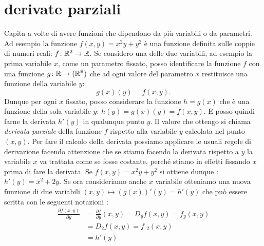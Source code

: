 \section{derivate parziali}

Capita a volte di avere funzioni che dipendono da più variabili o da parametri.
Ad esempio la funzione $f(x,y) = x^2y+y^2$ è una funzione definita 
sulle coppie di numeri reali: $f\colon {\mathbb R}^2\to {\mathbb R}$.
Se considero una delle due variabili, ad esempio la prima variabile $x$, 
come un parametro fissato, posso identificare la funzione $f$ con 
una funzione $g\colon {\mathbb R} \to ({\mathbb R}^{\mathbb R})$ 
che ad ogni valore del parametro $x$ restituisce una funzione 
della variabile $y$:
\[
  g(x)(y) = f(x,y).
\]
Dunque per ogni $x$ fissato, posso considerare la funzione $h=g(x)$
che è una funzione della sola variabile $y$: $h(y) = g(x)(y) = f(x,y)$.  
E posso quindi farne la derivata $h'(y)$ in qualunque punto $y$. 
Il valore che ottengo si chiama \emph{derivata parziale}%
%
della funzione $f$ rispetto alla variabile $y$ calcolata nel punto $(x,y)$.
Per fare il calcolo della derivata possiamo applicare le usuali regole di 
derivazione facendo attenzione che se stiamo 
facendo la derivata rispetto a $y$ la variabile $x$ va trattata come se 
fosse costante, perché stiamo in effetti fissando $x$ prima di fare la derivata.
Se $f(x,y) = x^2y+y^2$ si ottiene dunque%
:
$h'(y) = x^2 + 2y$.
Se ora consideriamo anche $x$ variabile otteniamo una nuova funzione di due 
variabili $(x,y)\mapsto (g(x))'(y) = h'(y)$ che può essere scritta 
con le seguenti notazioni%
:
\begin{align*}
\frac{\partial f(x,y)}{\partial y} 
&= \frac{\partial f}{\partial y}(x,y)
= D_y f(x,y)
= f_y (x,y) \\
&= D_2 f(x,y) = f_{,2} (x,y) \\
&= h'(y)
\end{align*}

